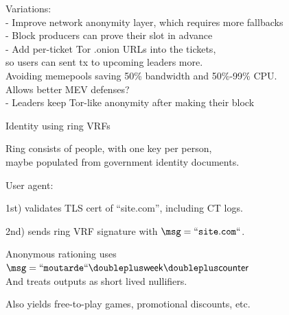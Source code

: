 \documentclass{beamer}
\begin{document}
\begin{frame}%

Variations: \\ \medskip
- Improve network anonymity layer, which requires more fallbacks \\ \medskip
- Block producers can prove their slot in advance \\ \medskip
- Add per-ticket Tor {.onion} URLs into the tickets,  \\ \smallskip
\hspace{5pt} so users can sent tx to upcoming leaders more. \\ \smallskip
\hspace{5pt} Avoiding memepools saving 50\% bandwidth and 50\%-99\% CPU. \\ \smallskip
\hspace{5pt} Allows better MEV defenses? \\ \medskip
- Leaders keep Tor-like anonymity after making their block \\

\end{frame}







\begin{frame}{Identity using ring VRFs}

Ring consists of people, with one key per person, \\ 
\hspace{10pt} maybe populated from government identity documents.

\bigskip\smallskip

User agent: \\ \smallskip

1st) validates TLS cert of ``site.com'', including CT logs. \\ \smallskip

2nd) sends ring VRF signature with $\msg = \mathtt{``site.com``}$. \\ \smallskip

% 
% 

\bigskip\bigskip 

Anonymous rationing uses $\msg = \mathtt{``moutarde``} \doubleplus \mathsf{week} \doubleplus \mathsf{counter}$ \\
\hspace{1pt} And treats outputs as short lived nullifiers.

\bigskip 

Also yields free-to-play games, promotional discounts, etc.

\end{frame}
\end{document}
